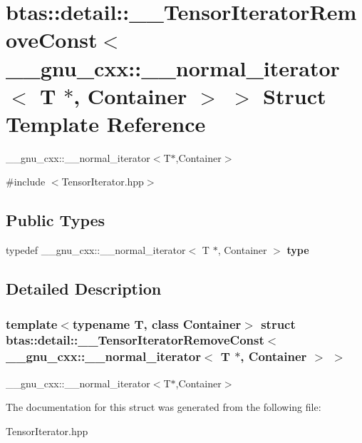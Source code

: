 \hypertarget{structbtas_1_1detail_1_1_____tensor_iterator_remove_const_3_01____gnu__cxx_1_1____normal__iterat0fc98e60937c76d753cf07ecae673162}{
\section{btas::detail::\_\-\_\-TensorIteratorRemoveConst$<$ \_\-\_\-gnu\_\-cxx::\_\-\_\-normal\_\-iterator$<$ T $\ast$, Container $>$ $>$ Struct Template Reference}
\label{structbtas_1_1detail_1_1_____tensor_iterator_remove_const_3_01____gnu__cxx_1_1____normal__iterat0fc98e60937c76d753cf07ecae673162}
}


\_\-\_\-gnu\_\-cxx::\_\-\_\-normal\_\-iterator$<$T$\ast$,Container$>$  


{\ttfamily \#include $<$TensorIterator.hpp$>$}\subsection*{Public Types}
\begin{DoxyCompactItemize}
\item 
\hypertarget{structbtas_1_1detail_1_1_____tensor_iterator_remove_const_3_01____gnu__cxx_1_1____normal__iterat0fc98e60937c76d753cf07ecae673162_abf4a64d46f7d9eeb9be1888dfb542170}{
typedef \_\-\_\-gnu\_\-cxx::\_\-\_\-normal\_\-iterator$<$ T $\ast$, Container $>$ {\bfseries type}}
\label{structbtas_1_1detail_1_1_____tensor_iterator_remove_const_3_01____gnu__cxx_1_1____normal__iterat0fc98e60937c76d753cf07ecae673162_abf4a64d46f7d9eeb9be1888dfb542170}

\end{DoxyCompactItemize}


\subsection{Detailed Description}
\subsubsection*{template$<$typename T, class Container$>$ struct btas::detail::\_\-\_\-TensorIteratorRemoveConst$<$ \_\-\_\-gnu\_\-cxx::\_\-\_\-normal\_\-iterator$<$ T $\ast$, Container $>$ $>$}

\_\-\_\-gnu\_\-cxx::\_\-\_\-normal\_\-iterator$<$T$\ast$,Container$>$ 

The documentation for this struct was generated from the following file:\begin{DoxyCompactItemize}
\item 
TensorIterator.hpp\end{DoxyCompactItemize}
